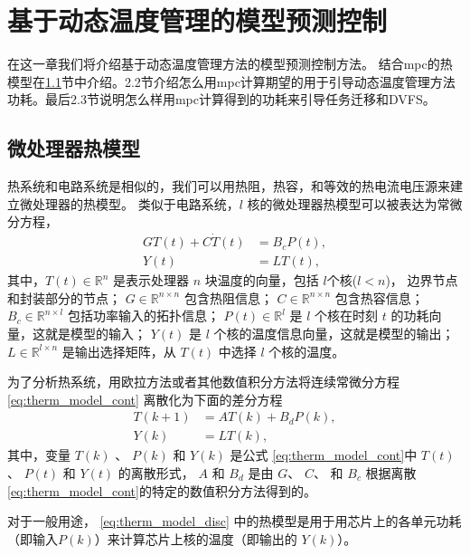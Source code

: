 
\chapter{基于动态温度管理的模型预测控制}

在这一章我们将介绍基于动态温度管理方法的模型预测控制方法。
结合mpc的热模型在\ref{sec:therm_model}节中介绍。2.2节介绍怎么用mpc计算期望的用于引导动态温度管理方法功耗。最后2.3节说明怎么样用mpc计算得到的功耗来引导任务迁移和DVFS。
\section{微处理器热模型}\label{sec:therm_model}
热系统和电路系统是相似的，我们可以用热阻，热容，和等效的热电流电压源来建立微处理器的热模型。
类似于电路系统，$l$ 核的微处理器热模型可以被表达为常微分方程，
\begin{equation}\label{eq:therm_model_cont} 
\begin{split}
G T(t) + C \dot{T}(t) &= B_c P(t),\\
Y(t) &= L T(t),
\end{split}
\end{equation}
其中，$T(t) \in \mathbb{R}^n$ 是表示处理器 $n$ 块温度的向量，包括 $l$个核($l < n$)， 边界节点和封装部分的节点；
$G \in \mathbb{R}^{n\times n}$ 包含热阻信息； 
$C \in \mathbb{R}^{n \times n}$ 包含热容信息；
$B_c \in \mathbb{R}^{n \times l}$ 包括功率输入的拓扑信息；
$P(t) \in \mathbb{R}^{l}$ 是 $l$ 个核在时刻 $t$ 的功耗向量，这就是模型的输入；
$Y(t)$ 是 $l$ 个核的温度信息向量，这就是模型的输出；
$L \in \mathbb{R}^{l \times n}$ 是输出选择矩阵，从 $T(t)$ 中选择 $l$ 个核的温度。

为了分析热系统，用欧拉方法或者其他数值积分方法将连续常微分方程 \eqref{eq:therm_model_cont} 离散化为下面的差分方程
\begin{equation}\label{eq:therm_model_disc}
\begin{split}
T(k+1) &= A T(k)+B_d P(k),\\
Y(k) &= L T(k),
\end{split}
\end{equation}
其中，变量 $T(k)$ 、 $P(k)$ 和 $Y(k)$ 是公式 \eqref{eq:therm_model_cont}中
$T(t)$ 、 $P(t)$ 和 $Y(t)$ 的离散形式，  $A$ 和
$B_d$ 是由 $G$、 $C$、 和 $B_c$ 根据离散\eqref{eq:therm_model_cont}的特定的数值积分方法得到的。

对于一般用途， \eqref{eq:therm_model_disc} 中的热模型是用于用芯片上的各单元功耗（即输入$P(k)$）来计算芯片上核的温度（即输出的 $Y(k)$）。


